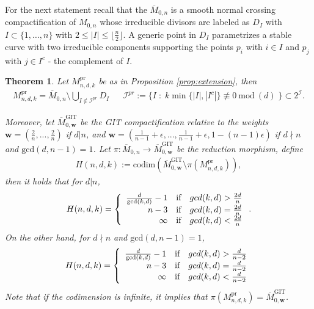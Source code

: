 \documentclass[12pt, letterpaper]{amsart}
\theoremstyle{plain}
\newtheorem{theorem}{Theorem}[section]
\theoremstyle{definition}
\begin{document}
For the next statement recall that the $\overline{M}_{0,n}$ is a smooth normal crossing compactification of $M_{0,n}$ whose irreducible divisors are labeled as $D_{I}$ with $I \subset \{1, \ldots, n\}$ with $2\leq |I|\leq \lfloor\frac{n}{2}\rfloor$. A generic point in $D_I$ parametrizes a stable curve with two irreducible components supporting the points $p_i$ with $i \in I$ and $p_{j}$ with $j \in I^c$ - the complement of $I$.
\begin{theorem}\label{thm:codimensions}
Let $M_{n,d,k}^{\mathrm{pr}}$ be as in Proposition \ref{prop:extension}, then 
\begin{align*}
M_{n,d,k}^{\mathrm{pr}} = 
\overline{M}_{0,n}
\setminus
\bigcup_{ I \notin \mathcal{I}^{pr} } 
D_{I}
&& 
\mathcal{I}^{pr} := 
\{ I \; : \;
k\min\{ |I|, |I^c| \} \not\equiv 0 \ \text{mod} \ (d) 
\; \}\subset 2^{\mathcal{I}}.
\end{align*}

\noindent Moreover, let
$
\overline{M}^{\mathrm{\mathrm{\mathrm{GIT}}}}_{0, \mathbf{w}} $ be the GIT compactification relative to the weights
$ \mathbf{w} = (\frac{2}{n}, ..., \frac{2}{n})$
if $d|n$, and 
$
\mathbf{w} = 
(\frac{1}{n-1}+\epsilon, ..., \frac{1}{n-1}+\epsilon, 1-(n-1)\epsilon )
$
if  $d \nmid n$ and 
$\mathrm{gcd}(d,n-1)=1$. 
Let  
$
\pi: \overline{M}_{0,n} \longrightarrow \overline{M}^{\mathrm{\mathrm{\mathrm{GIT}}}}_{0, \mathbf{w}} 
$ be the reduction morphism, define
\begin{align*}
H(n,d,k):=\mathrm{codim}\left( 
\overline{M}^{\mathrm{\mathrm{\mathrm{GIT}}}}_{0, \mathbf{w}} 
\setminus
\pi(M_{n,d,k}^{\mathrm{pr}})
\right),
\end{align*}
then it holds that for $d|n$, 
\begin{align*}
H(n,d,k) = \left\{ \begin{array}{rcl}
 \frac{d}{\mathrm{gcd}(k,d)}-1 & \mbox{\textrm{if}}
& \textrm{gcd}(k,d)>\frac{2d}{n} \\ n-3 & \mbox{\textrm{if}} & \textrm{gcd}(k,d)=\frac{2d}{n} \\ \infty & \mbox{\textrm{if}} & \textrm{gcd}(k,d)<\frac{2d}{n}
\\
\end{array}\right..    
\end{align*}
On the other hand, for $d\nmid n$ and $\mathrm{gcd}(d,n-1)=1$, 
\begin{align*}
H(n,d,k) = \left\{ \begin{array}{rcl}
 \frac{d}{\mathrm{gcd}(k,d)}-1 & \mbox{\textrm{if}}
& \textrm{gcd}(k,d)>\frac{d}{n-2} \\ n-3 & \mbox{\textrm{if}} & \textrm{gcd}(k,d)=\frac{d}{n-2} \\ \infty & \mbox{\textrm{if}} & \textrm{gcd}(k,d)<\frac{d}{n-2}
\\
\end{array}\right.    
\end{align*}
Note that if the codimension is infinite, it implies that $\pi(M_{n,d,k}^{\mathrm{pr}})=\overline{M}^{\mathrm{\mathrm{\mathrm{GIT}}}}_{0, \mathbf{w}}$.
\end{theorem}
\end{document}
